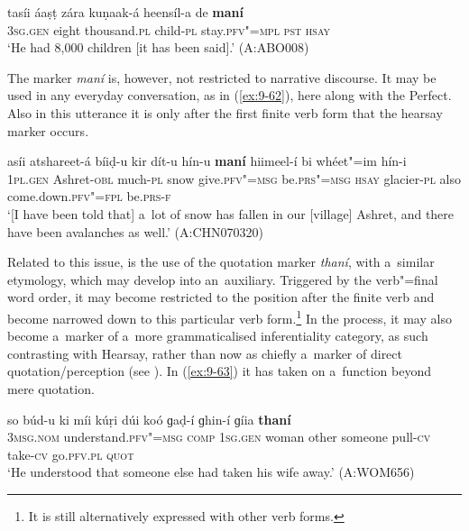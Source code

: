 \begin{exe}
\ex
\label{ex:9-61}
\gll tasíi áaṣṭ zára kuṇaak-á heensíl-a de \textbf{maní} \\
3\textsc{sg.gen} eight thousand.\textsc{pl} child-\textsc{pl} stay.\textsc{pfv"=mpl} \textsc{pst} \textsc{hsay} \\
\glt `He had 8,000 children [it has been said].' (A:ABO008)
\end{exe}

The marker \textit{maní} is, however, not restricted to narrative discourse. It may be used in any everyday conversation, as in (\ref{ex:9-62}), here along with the Perfect. Also in this utterance it is only after the first finite verb form that the hearsay marker occurs.
\begin{exe}
\ex
\label{ex:9-62}
\gll asíi atshareet-á bíiḍ-u kir dít-u hín-u \textbf{maní} hiimeel-í bi whéet"=im hín-i\\
\textsc{1pl.gen} Ashret-\textsc{obl} much-\textsc{pl} snow give.\textsc{pfv"=msg} be.\textsc{prs"=msg} \textsc{hsay} glacier-\textsc{pl} also come.down.\textsc{pfv"=fpl} be.\textsc{prs-f}\\
\glt `[I have been told that] a~lot of snow has fallen in our [village] Ashret, and there have been avalanches as well.' (A:CHN070320)
\end{exe}

Related to this issue, is the use of the quotation marker \textit{thaní}, with a~similar etymology, which may develop into an~auxiliary. Triggered by the verb"=final word order, it may become restricted to the position after the finite verb and become narrowed down to this particular verb form.\footnote{It is still alternatively expressed with other verb forms.} In the process, it may also become a~marker of a~more grammaticalised inferentiality category, as such contrasting with Hearsay, rather than now as chiefly a~marker of direct quotation/perception (see ). In (\ref{ex:9-63}) it has taken on a~function beyond mere quotation.
\begin{exe}
\ex
\label{ex:9-63}
\gll so búd-u ki míi kúṛi dúi koó ɡaḍ-í ɡhin-í ɡíia \textbf{thaní}  \\
\textsc{3msg.nom} understand.\textsc{pfv"=msg} \textsc{comp} \textsc{1sg.gen} woman  other someone pull-\textsc{cv} take-\textsc{cv} go.\textsc{pfv.pl} \textsc{quot} \\
\glt `He understood that someone else had taken his wife away.' (A:WOM656)
\end{exe}

